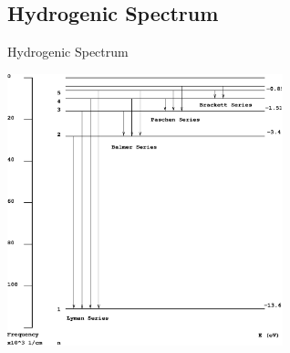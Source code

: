 \documentclass[aspectratio=1610,xcolor=dvipsnames,t]{beamer}
\begin{document}
    \subsection{Hydrogenic Spectrum}
    \begin{frame}{Hydrogenic Spectrum} 

        \centering
        \includegraphics[width=0.6\textwidth]{spectrum}
    \end{frame} 
\end{document}

